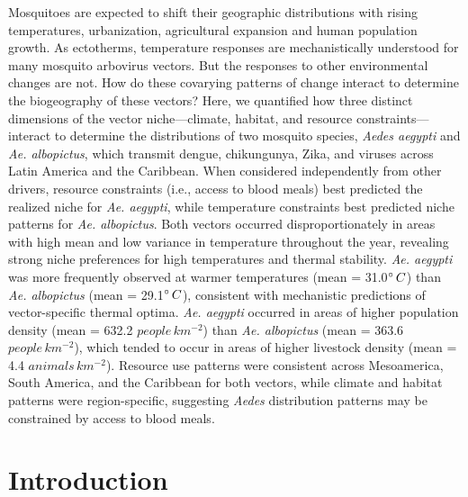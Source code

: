 Mosquitoes are expected to shift their geographic distributions with rising temperatures, urbanization, agricultural expansion and human population growth. As ectotherms, temperature responses are mechanistically understood for many mosquito arbovirus vectors. But the responses to other environmental changes are not. How do these covarying patterns of change interact to determine the biogeography of these vectors? Here, we quantified how three distinct dimensions of the vector niche—climate, habitat, and resource constraints—interact to determine the distributions of two mosquito species, \textit{Aedes aegypti} and \textit{Ae. albopictus}, which transmit dengue, chikungunya, Zika, and viruses across Latin America and the Caribbean. When considered independently from other drivers, resource constraints (i.e., access to blood meals) best predicted the realized niche for \textit{Ae. aegypti}, while temperature constraints best predicted niche patterns for \textit{Ae. albopictus}. Both vectors occurred disproportionately in areas with high mean and low variance in temperature throughout the year, revealing strong niche preferences for high temperatures and thermal stability. \textit{Ae. aegypti} was more frequently observed at warmer temperatures (mean = 31.0$\degree\, C$) than \textit{Ae. albopictus} (mean = 29.1$\degree\, C$), consistent with mechanistic predictions of vector-specific thermal optima. \textit{Ae. aegypti} occurred in areas of higher population density (mean = 632.2 $people\, km^{-2}$) than \textit{Ae. albopictus} (mean = 363.6 $people\, km^{-2}$), which tended to occur in areas of higher livestock density (mean = 4.4 $animals\, km^{-2}$). Resource use patterns were consistent across Mesoamerica, South America, and the Caribbean for both vectors, while climate and habitat patterns were region-specific, suggesting \textit{Aedes} distribution patterns may be constrained by access to blood meals.

\section{Introduction}

